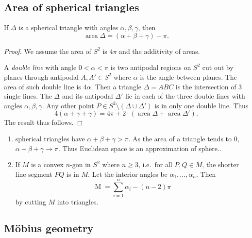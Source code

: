 \documentclass[a4paper]{article}
\begin{document}
\subsection{Area of spherical triangles}

\begin{proposition}
  If \(\Delta\) is a spherical triangle with angles \(\alpha, \beta, \gamma\), then
  \[
    \operatorname{area} \Delta = (\alpha + \beta + \gamma) - \pi.
  \]
\end{proposition}

\begin{proof}
  We assume the area of \(S^2\) is \(4\pi\) and the additivity of areas.

  A \emph{double line} with angle \(0 < \alpha < \pi\) is two antipodal regions on \(S^2\) cut out by planes through antipodal \(A, A' \in S^2\) where \(\alpha\) is the angle between planes. The area of such double line is \(4\alpha\). Then a triangle \(\Delta = ABC\) is the intersection of 3 single lines. The \(\Delta\) and its antipodal \(\Delta'\) lie in each of the three double lines with angles \(\alpha, \beta, \gamma\). Any other point \(P \in S^2 \setminus (\Delta \cup \Delta')\) is in only one double line. Thus
  \[
    4(\alpha + \gamma + \gamma) = 4\pi + 2 \cdot (\operatorname{area}\Delta + \operatorname{area}\Delta').
  \]
  The result thus follows.
\end{proof}

\begin{remark}\leavevmode
  \begin{enumerate}
  \item spherical triangles have \(\alpha + \beta + \gamma > \pi\). As the area of a triangle tends to \(0\), \(\alpha + \beta + \gamma \to \pi\). Thus Euclidean space is an approximation of sphere..
  \item If \(M\) is a convex \(n\)-gon in \(S^2\) where \(n \geq 3\), i.e.\ for all \(P, Q \in M\), the shorter line segment \(PQ\) is in \(M\). Let the interior angles be \(\alpha_1, \dots, \alpha_n\). Then
    \[
      \operatorname M = \sum_{i = 1}^n \alpha_i - (n - 2)\pi
    \]
    by cutting \(M\) into triangles.
  \end{enumerate}
\end{remark}

\subsection{Möbius geometry}
\end{document}
